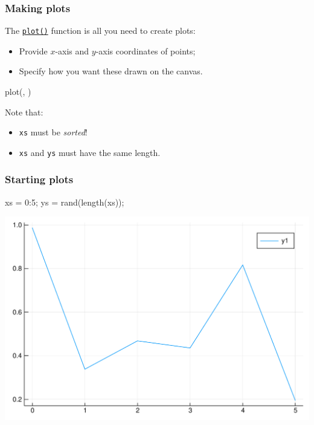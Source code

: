 \documentclass[english,serif,mathserif,xcolor=pdftex,dvipsnames,table]{beamer}
\begin{document}
\begin{frame}[fragile]
  \frametitle{Making plots}
  The
  \href{http://docs.juliaplots.org/latest/basics/}{\texttt{plot()}}
  function is all you need to create plots:
  \begin{itemize}
  \item \alert<1>{Provide $x$-axis and $y$-axis coordinates of points;}
  \item \alert<2>{Specify how you want these drawn on the canvas.}
  \end{itemize}
\begin{semiverbatim}
\julia plot(, )
\end{semiverbatim}

  \+
  Note that:
  \begin{itemize}
  \item \texttt{xs} must be \emph{sorted}!
  \item \texttt{xs} and \texttt{ys} must have the same length.
  \end{itemize}
\end{frame}

\begin{frame}[fragile]
  \frametitle{Starting plots}
\begin{semiverbatim}\small
\julia xs = 0:5;
\julia ys = rand(length(xs));
\julia {}
\end{semiverbatim}
  \begin{center}
    \includegraphics[height=0.66\textheight]{fig/plot1.pdf}
  \end{center}
\end{frame}
\end{document}
